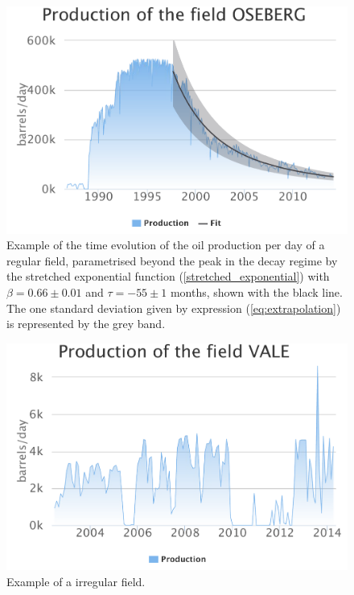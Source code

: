 \documentclass[review]{elsarticle}
\begin{document}
\noindent 
\begin{figure}[H]
\includegraphics[width=1\columnwidth]{oseberg}
\caption{\doublespacing
Example of the time evolution of the oil production per day of
a regular field, parametrised beyond the peak in the decay
regime by the stretched exponential 
function (\ref{stretched_exponential}) with $\beta=0.66\pm0.01$ and $\tau=-55\pm1$ months,
shown with the black line.  The one standard deviation given by expression
(\ref{eq:extrapolation}) is represented by the grey band.}
\label{regular} 
\end{figure}

\pagebreak

\noindent 
\begin{figure}[H]
\includegraphics[width=1\columnwidth]{vale}
\caption{Example of a irregular field.}
\label{irregular} 
\end{figure}
\end{document}
